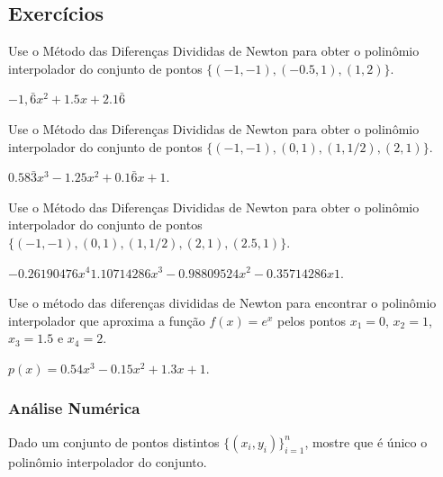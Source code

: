 \subsection{Exercícios}

\begin{exer}
  Use o Método das Diferenças Divididas de Newton para obter o polinômio interpolador do conjunto de pontos $\{(-1, -1), (-0.5, 1), (1, 2)\}$.
\end{exer}
\begin{resp}
  $-1,\bar{6}x^2 + 1.5x + 2.1\bar{6}$
\end{resp}

\begin{exer}
  Use o Método das Diferenças Divididas de Newton para obter o polinômio interpolador do conjunto de pontos $\{(-1, -1), (0, 1), (1, 1/2), (2, 1)\}$.
\end{exer}
\begin{resp}
  $0.58\bar{3}x^3 - 1.25x^2 + 0.1\bar{6}x + 1$. 
\end{resp}

\begin{exer}
  Use o Método das Diferenças Divididas de Newton para obter o polinômio interpolador do conjunto de pontos $\{(-1, -1), (0, 1), (1, 1/2), (2, 1), (2.5, 1)\}$.
\end{exer}
\begin{resp}
  $-0.26190476x^4  1.10714286x^3 -0.98809524x^2 -0.35714286x  1$.  
\end{resp}

\begin{exer}
  Use o método das diferenças divididas de Newton para encontrar o polinômio interpolador que aproxima a função $f(x)=e^{x}$ pelos pontos $x_1=0$, $x_2=1$, $x_3=1.5$ e $x_4=2$.
\end{exer}
\begin{resp}
$p(x) = 0.54x^3 - 0.15x^2 + 1.3x + 1$.
\end{resp}

\subsubsection{Análise Numérica}

\begin{exer}\label{cap_interp_sec_difdiv:exer:pinterp_unico}
  Dado um conjunto de pontos distintos $\{(x_i, y_i)\}_{i=1}^n$, mostre que é único o polinômio interpolador do conjunto.
\end{exer}

\ifisbook
